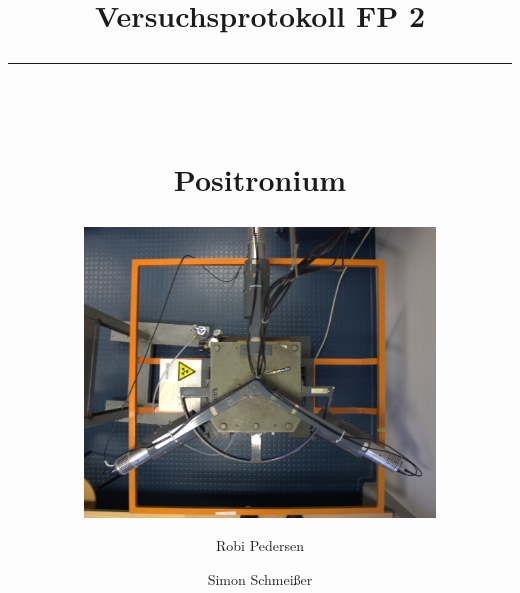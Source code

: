 \documentclass[a4paper,oneside, bibliography=totocnumbered]{scrartcl} %
\title{Versuchsprotokoll FP 2\\
\rule{0.5\textwidth}{0.4pt}\\
\vspace*{1cm}
\begin{Huge}
Positronium 
\end{Huge}
}
\subtitle{\vspace*{1cm}
\includegraphics[width=0.7\textwidth]{BilderAufbau/IMG_3836.jpg}
\vspace*{1.5cm}}
\author{Robi Pedersen \and Simon Schmeißer}
\date{Versuchsdurchführung 14.03. - 18.03.2011
\vspace*{1cm}\\
\rule{0.8\textwidth}{0.4pt}\\
Physikalisches Institut, Albert-Ludwigs-Universität Freiburg
}
\begin{document}
\begin{titlepage}
  \maketitle
  \vfill
  \thispagestyle{empty}
\end{titlepage}

\tableofcontents
\clearpage






\clearpage


\clearpage

\nocite{staatsex, versuchsanleitung, Demtroeder3}
 

\end{document}
